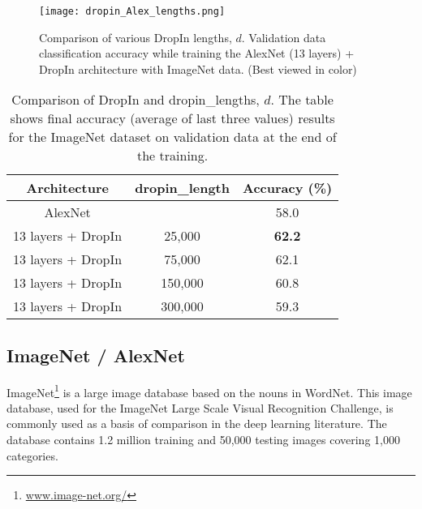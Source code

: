 \documentclass[10pt,twocolumn,letterpaper]{article}
\newcommand{\dropin}{DropIn }
\begin{document}
\begin{figure}[htb]
\begin{center}
   \texttt{[image: dropin\_Alex\_lengths.png]}
\end{center}
  \vspace{-15pt}
   \caption{Comparison of various \dropin lengths, $d$.  Validation data classification accuracy while training the AlexNet (13 layers) + \dropin architecture with ImageNet data. (Best viewed in color) 
}
\label{fig:AlexLengths}
  \vspace{-5pt}
\end{figure}


\begin{table}[tb]
\begin{center}
  \begin{tabular}{| c | c | c |}
    \hline
    Architecture & dropin\_length & Accuracy (\%) \\ \hline \hline
   AlexNet &     & 58.0 \\ \hline
   13 layers + \dropin & 25,000  & \textbf{62.2} \\ \hline
   13 layers + \dropin & 75,000  & 62.1 \\ \hline
   13 layers + \dropin & 150,000  & 60.8 \\ \hline
   13 layers + \dropin & 300,000  & 59.3 \\ \hline
  \end{tabular}
  \caption{Comparison of \dropin and dropin\_lengths, $d$. The table shows final accuracy (average of last three values) results for the ImageNet dataset on validation data at the end of the training.}
  \label{tab:dropinLengths}
\end{center}
  \vspace{-20pt}
\end{table}


\subsection{ImageNet / AlexNet}
\label{sec:alexnet}

ImageNet\footnote{\url{www.image-net.org/}} \cite{Imagenet15} is a large image database based on the nouns in  WordNet.
This image database, used for the ImageNet Large Scale Visual Recognition Challenge, is commonly used as a basis of comparison in the deep learning literature.
The database contains 1.2 million training and 50,000 testing images covering 1,000 categories.
\end{document}

